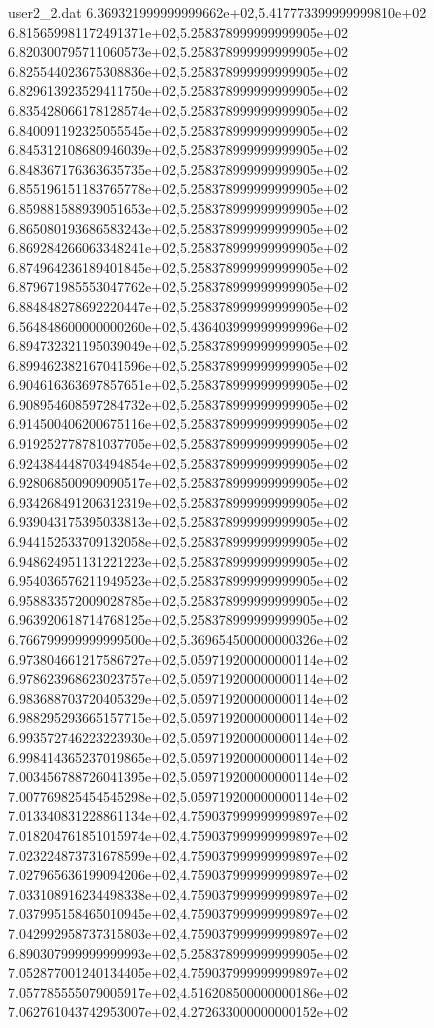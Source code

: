 \begin{filecontents}{user2_2.dat}
6.369321999999999662e+02,5.417773399999999810e+02
6.815659981172491371e+02,5.258378999999999905e+02
6.820300795711060573e+02,5.258378999999999905e+02
6.825544023675308836e+02,5.258378999999999905e+02
6.829613923529411750e+02,5.258378999999999905e+02
6.835428066178128574e+02,5.258378999999999905e+02
6.840091192325055545e+02,5.258378999999999905e+02
6.845312108680946039e+02,5.258378999999999905e+02
6.848367176363635735e+02,5.258378999999999905e+02
6.855196151183765778e+02,5.258378999999999905e+02
6.859881588939051653e+02,5.258378999999999905e+02
6.865080193686583243e+02,5.258378999999999905e+02
6.869284266063348241e+02,5.258378999999999905e+02
6.874964236189401845e+02,5.258378999999999905e+02
6.879671985553047762e+02,5.258378999999999905e+02
6.884848278692220447e+02,5.258378999999999905e+02
6.564848600000000260e+02,5.436403999999999996e+02
6.894732321195039049e+02,5.258378999999999905e+02
6.899462382167041596e+02,5.258378999999999905e+02
6.904616363697857651e+02,5.258378999999999905e+02
6.908954608597284732e+02,5.258378999999999905e+02
6.914500406200675116e+02,5.258378999999999905e+02
6.919252778781037705e+02,5.258378999999999905e+02
6.924384448703494854e+02,5.258378999999999905e+02
6.928068500909090517e+02,5.258378999999999905e+02
6.934268491206312319e+02,5.258378999999999905e+02
6.939043175395033813e+02,5.258378999999999905e+02
6.944152533709132058e+02,5.258378999999999905e+02
6.948624951131221223e+02,5.258378999999999905e+02
6.954036576211949523e+02,5.258378999999999905e+02
6.958833572009028785e+02,5.258378999999999905e+02
6.963920618714768125e+02,5.258378999999999905e+02
6.766799999999999500e+02,5.369654500000000326e+02
6.973804661217586727e+02,5.059719200000000114e+02
6.978623968623023757e+02,5.059719200000000114e+02
6.983688703720405329e+02,5.059719200000000114e+02
6.988295293665157715e+02,5.059719200000000114e+02
6.993572746223223930e+02,5.059719200000000114e+02
6.998414365237019865e+02,5.059719200000000114e+02
7.003456788726041395e+02,5.059719200000000114e+02
7.007769825454545298e+02,5.059719200000000114e+02
7.013340831228861134e+02,4.759037999999999897e+02
7.018204761851015974e+02,4.759037999999999897e+02
7.023224873731678599e+02,4.759037999999999897e+02
7.027965636199094206e+02,4.759037999999999897e+02
7.033108916234498338e+02,4.759037999999999897e+02
7.037995158465010945e+02,4.759037999999999897e+02
7.042992958737315803e+02,4.759037999999999897e+02
6.890307999999999993e+02,5.258378999999999905e+02
7.052877001240134405e+02,4.759037999999999897e+02
7.057785555079005917e+02,4.516208500000000186e+02
7.062761043742953007e+02,4.272633000000000152e+02

\end{filecontents}
